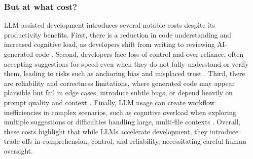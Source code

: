 \subsubsection{But at what cost?}
LLM-assisted development introduces several notable costs despite its productivity benefits. First, there is a reduction in code understanding and increased cognitive load, as developers shift from writing to reviewing AI-generated code \cite{barke2022grounded,bird2023copilot}. Second, developers face loss of control and over-reliance, often accepting suggestions for speed even when they do not fully understand or verify them, leading to risks such as anchoring bias and misplaced trust \cite{bird2023copilot}. Third, there are reliability and correctness limitations, where generated code may appear plausible but fail in edge cases, introduce subtle bugs, or depend heavily on prompt quality and context \cite{stages_dev_agarwal2024copilot}. Finally, LLM usage can create workflow inefficiencies in complex scenarios, such as cognitive overload when exploring multiple suggestions or difficulties handling large, multi-file contexts \cite{peng2023copilot}. Overall, these costs highlight that while LLMs accelerate development, they introduce trade-offs in comprehension, control, and reliability, necessitating careful human oversight.
